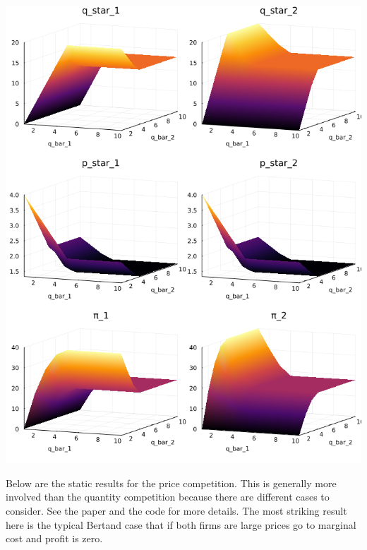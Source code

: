 \documentclass{article}
\begin{document}
\includegraphics[scale=.65]{q_static.png}

\pagebreak

Below are the static results for the price competition.  This is generally more involved than the quantity competition because there are different cases to consider. See the paper and the code for more details.  The most striking result here is the typical Bertand case that if both firms are large prices go to marginal cost and profit is zero.
\end{document}
